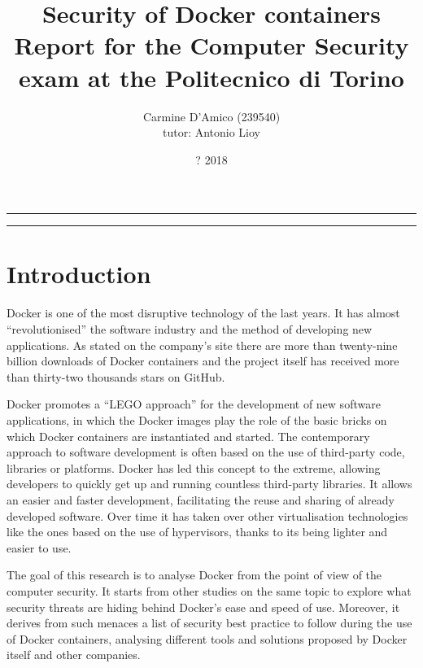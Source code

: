 \documentclass[a4paper,12pt]{article}
\begin{document}
\title{Security of Docker containers \\
{\normalsize Report for the Computer Security exam at the Politecnico di Torino}
} \author{Carmine D'Amico (239540) \\
{\normalsize tutor: Antonio Lioy} }
\date{? 2018}
\maketitle

\vfill

\rule{\textwidth}{1pt}

\tableofcontents

\rule{\textwidth}{1pt}

\vfill

\newpage

\section{Introduction}

Docker is one of the most disruptive technology of the last years. It has almost
``revolutionised'' the software industry and the method of developing new
applications. As stated on the company's site \cite{docker_numbers} there are
more than twenty-nine billion downloads of Docker containers and the project
itself has received more than thirty-two thousands stars on GitHub. \par Docker
promotes a ``LEGO approach'' for the development of new software applications,
in which the Docker images play the role of the basic bricks on which Docker
containers are instantiated and started. The contemporary approach to software
development is often based on the use of third-party code, libraries or
platforms. Docker has led this concept to the extreme, allowing developers to
quickly get up and running countless third-party libraries. It allows an easier
and faster development, facilitating the reuse and sharing of already developed
software. Over time it has taken over other virtualisation technologies like the
ones based on the use of hypervisors, thanks to its being lighter and easier to
use. \par The goal of this research is to analyse Docker from the point of view
of the computer security. It starts from other studies on the same topic to
explore what security threats are hiding behind Docker's ease and speed of use.
Moreover, it derives from such menaces a list of security best practice to
follow during the use of Docker containers, analysing different tools and
solutions proposed by Docker itself and other companies. 
\end{document}
